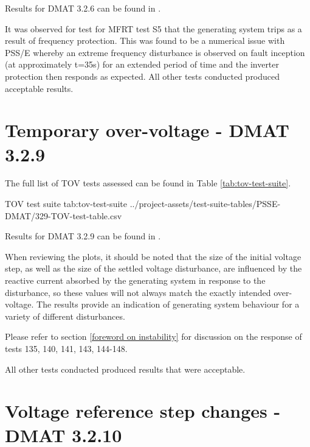 \documentclass{../grid-link-report}
\newcommand{\projectassetsdir}{../project-assets}
\begin{document}
	Results for DMAT 3.2.6 can be found in .
	
	It was observed for test for MFRT test S5 that the generating system trips as a result of frequency protection. This was found to be a numerical issue with PSS/E whereby an extreme frequency disturbance is observed on fault inception (at approximately t=35s) for an extended period of time and the inverter protection then responds as expected. All other tests conducted produced acceptable results.
	

	
	\section{Temporary over-voltage - DMAT 3.2.9}
	
	
	
	
	The full list of \ac{TOV} tests assessed can be found in Table \ref{tab:tov-test-suite}.
	
	{
		\fontsize{6}{8}\selectfont
		\autoscaledlongtable
		{TOV test suite}
		{tab:tov-test-suite}
		{\projectassetsdir/test-suite-tables/PSSE-DMAT/329-TOV-test-table.csv}
	}
	
	Results for DMAT 3.2.9 can be found in .
	
	When reviewing the plots, it should be noted that the size of the initial voltage step, as well as the size of the settled voltage disturbance, are influenced by the reactive current absorbed by the generating system in response to the disturbance, so these values will not always match the exactly intended over-voltage. The results provide an indication of generating system behaviour for a variety of different disturbances.
	
	Please refer to section \ref{foreword on instability} for discussion on the response of tests 135, 140, 141, 143, 144-148.
	
	All other tests conducted produced results that were acceptable. 


	
	\section{Voltage reference step changes - DMAT 3.2.10}	
	\label{sec:vref-step-changes}
	
\end{document}
